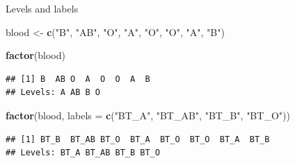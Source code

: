 \documentclass[ignorenonframetext,]{beamer}
\newenvironment{Shaded}{\begin{snugshade}}{\end{snugshade}}
\newcommand{\DataTypeTok}[1]{\textcolor[rgb]{0.13,0.29,0.53}{#1}}
\newcommand{\KeywordTok}[1]{\textcolor[rgb]{0.13,0.29,0.53}{\textbf{#1}}}
\newcommand{\NormalTok}[1]{#1}
\newcommand{\StringTok}[1]{\textcolor[rgb]{0.31,0.60,0.02}{#1}}
\begin{document}
\begin{frame}[fragile]{Levels and labels}
\protect\hypertarget{levels-and-labels-1}{}

\begin{Shaded}
\begin{Highlighting}[]
\NormalTok{blood <-}\StringTok{ }\KeywordTok{c}\NormalTok{(}\StringTok{"B"}\NormalTok{, }\StringTok{"AB"}\NormalTok{, }\StringTok{"O"}\NormalTok{, }\StringTok{"A"}\NormalTok{, }\StringTok{"O"}\NormalTok{, }\StringTok{"O"}\NormalTok{, }\StringTok{"A"}\NormalTok{, }\StringTok{"B"}\NormalTok{) }

\KeywordTok{factor}\NormalTok{(blood)}
\end{Highlighting}
\end{Shaded}

\begin{verbatim}
## [1] B  AB O  A  O  O  A  B 
## Levels: A AB B O
\end{verbatim}

\begin{Shaded}
\begin{Highlighting}[]
\KeywordTok{factor}\NormalTok{(blood, }
         \DataTypeTok{labels =} \KeywordTok{c}\NormalTok{(}\StringTok{"BT_A"}\NormalTok{, }\StringTok{"BT_AB"}\NormalTok{, }\StringTok{"BT_B"}\NormalTok{, }\StringTok{"BT_O"}\NormalTok{))}
\end{Highlighting}
\end{Shaded}

\begin{verbatim}
## [1] BT_B  BT_AB BT_O  BT_A  BT_O  BT_O  BT_A  BT_B 
## Levels: BT_A BT_AB BT_B BT_O
\end{verbatim}

\end{frame}
\end{document}
